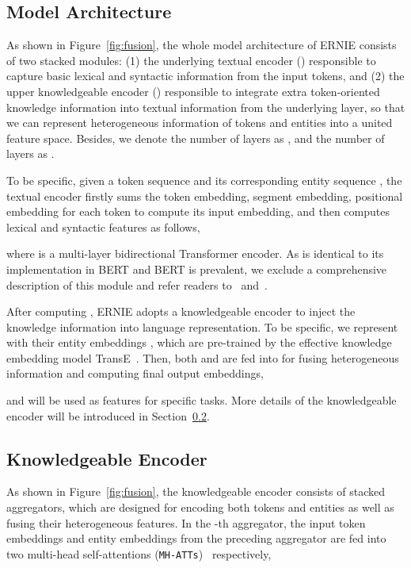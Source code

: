 \documentclass[11pt,a4paper]{article}
\begin{document}
\subsection{Model Architecture}
\label{sec:architecture}

As shown in Figure~\ref{fig:fusion}, the whole model architecture of ERNIE consists of two stacked modules: (1) the underlying textual encoder () responsible to capture basic lexical and syntactic information from the input tokens, and (2) the upper knowledgeable encoder () responsible to integrate extra token-oriented knowledge information into textual information from the underlying layer, so that we can represent heterogeneous information of tokens and entities into a united feature space. Besides, we denote the number of  layers as , and the number of  layers as .

To be specific, given a token sequence  and its corresponding entity sequence , the textual encoder firstly sums the token embedding, segment embedding, positional embedding for each token to compute its input embedding, and then computes lexical and syntactic features  as follows,

where  is a multi-layer bidirectional Transformer encoder. As  is identical to its implementation in BERT and BERT is prevalent, we exclude a comprehensive description of this module and refer readers to~ and~.

After computing , ERNIE adopts a knowledgeable encoder  to inject the knowledge information into language representation. To be specific, we represent  with their entity embeddings , which are pre-trained by the effective knowledge embedding model TransE~\cite{bordes2013translating}. Then, both  and  are fed into  for fusing heterogeneous information and computing final output embeddings,

 and  will be used as features for specific tasks. More details of the knowledgeable encoder  will be introduced in Section~\ref{sec:k-encoder}. 



\subsection{Knowledgeable Encoder}
\label{sec:k-encoder}

As shown in Figure~\ref{fig:fusion}, the knowledgeable encoder  consists of stacked aggregators, which are designed for encoding both tokens and entities as well as fusing their heterogeneous features. In the -th aggregator, the input token embeddings  and entity embeddings  from the preceding aggregator are fed into two multi-head self-attentions (\texttt{MH-ATTs})~\cite{vaswani2017attention} respectively,
\end{document}
